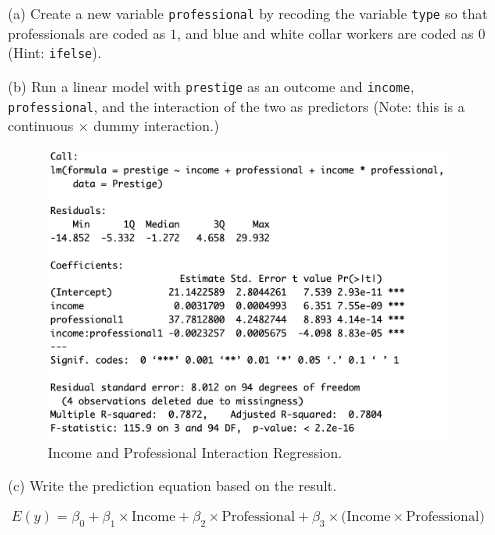 \documentclass[12pt,letterpaper]{article}
\begin{document}
\newpage
\begin{enumerate}
	
	\item [(a)]
	Create a new variable \texttt{professional} by recoding the variable \texttt{type} so that professionals are coded as $1$, and blue and white collar workers are coded as $0$ (Hint: \texttt{ifelse}).
	
	
	\vspace{.25cm}
	
	
	\item [(b)]
	Run a linear model with \texttt{prestige} as an outcome and \texttt{income}, \texttt{professional}, and the interaction of the two as predictors (Note: this is a continuous $\times$ dummy interaction.)
	
		

	\begin{figure}[h!]\centering
	\caption{\footnotesize Income and Professional Interaction Regression.}
	\label{fig:plot_1}
	\includegraphics[width=1\textwidth]{Q1_Regression_Summary}
\end{figure}

	
	\vspace{6cm}
	\item [(c)]
	Write the prediction equation based on the result.
	
	$$E(y)= {\beta_0} + {\beta_1} \times \text{Income}+ {\beta_2} \times \text{Professional}+ {\beta_3}\times \text{(Income}\times \text{Professional)}$$
	

\end{enumerate}
\end{document}
